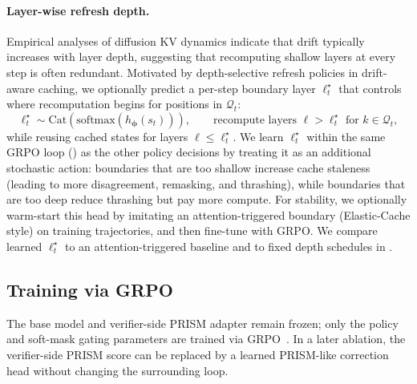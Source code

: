 \documentclass[11pt]{article}
\newcommand{\cQ}{\mathcal{Q}}
\newcommand{\bphi}{\bm{\phi}}
\begin{document}
\paragraph{Layer-wise refresh depth.}
Empirical analyses of diffusion KV dynamics indicate that drift typically increases
with layer depth, suggesting that recomputing shallow layers at every step is often redundant.
Motivated by depth-selective refresh policies in drift-aware caching, we optionally predict a per-step
boundary layer $\ell_t^\star$ that controls where recomputation begins for positions in $\cQ_t$:
\begin{equation}
    \ell_t^\star \sim \text{Cat}\!\left(\text{softmax}(h_{\bphi}(s_t))\right),
    \qquad
    \text{recompute layers } \ell > \ell_t^\star \text{ for } k \in \cQ_t,
    \label{eq:learned_boundary_layer}
\end{equation}
while reusing cached states for layers $\ell \le \ell_t^\star$. We learn $\ell_t^\star$ within the same GRPO
loop () as the other policy decisions by treating it as an additional stochastic action: boundaries that are
too shallow increase cache staleness (leading to more disagreement, remasking, and thrashing),
while boundaries that are too deep reduce thrashing but pay more compute. For stability, we optionally
warm-start this head by imitating an attention-triggered boundary (Elastic-Cache style) on training
trajectories, and then fine-tune with GRPO. We compare learned $\ell_t^\star$ to an attention-triggered
baseline and to fixed depth schedules in .

\subsection{Training via GRPO}
\label{sec:optimization}

The base model and verifier-side PRISM adapter remain frozen; only the policy and soft-mask gating parameters are trained via GRPO~\cite{shao2024deepseekmath}. In a later ablation, the verifier-side PRISM score can be replaced by a learned PRISM-like correction head without changing the surrounding loop.
\end{document}
